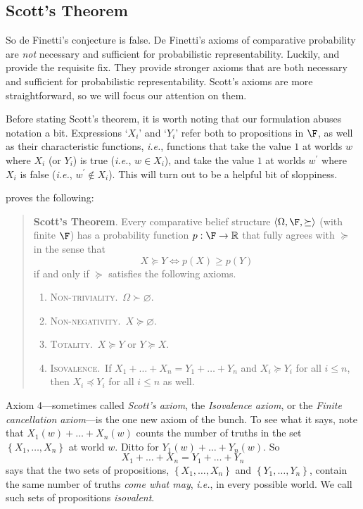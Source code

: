 \subsection{Scott's Theorem}


So de Finetti's conjecture is false. De Finetti's axioms of comparative probability are \textit{not} necessary and sufficient for probabilistic representability. Luckily, \citet{Kraft1959} and \citet{Scott1964} provide the requisite fix. They provide stronger axioms that are both necessary and sufficient for probabilistic representability. Scott's axioms are more straightforward, so we will focus our attention on them. 

Before stating Scott's theorem, it is worth noting that our formulation abuses notation a bit. Expressions `$X_i$' and `$Y_i$' refer both to propositions in $\F$, as well as their characteristic functions, \textit{i.e.}, functions that take the value $1$ at worlds $w$ where $X_i$ (or $Y_i$) is true (\textit{i.e.}, $w\in X_i$), and take the value $1$ at worlds $w^\prime$ where $X_i$ is false (\textit{i.e.}, $w^\prime\not\in X_i$). This will turn out to be a helpful bit of sloppiness. 


\citet{Scott1964} proves the following: 
\begin{quote}
\textbf{Scott's Theorem}. Every comparative belief structure $\left<\Omega,\F,\succeq\right>$ (with finite $\F$) has a probability function $p:\F\rightarrow\mathbb{R}$ that fully agrees with $\succeq$ in the sense that
\[
X\succeq Y \Leftrightarrow p(X)\geq p(Y)
\]
if and only if $\succeq$ satisfies the following axioms.
\begin{enumerate}
\item \textsc{Non-triviality}.\, $\Omega\succ \varnothing$.
\item \textsc{Non-negativity}.\, $X\succeq \varnothing$.
\item \textsc{Totality}.\, $X\succeq Y$ or $Y\succeq X$.
\item \textsc{Isovalence}.\, If $X_1+\ldots+X_n=Y_1+\ldots+Y_n$ and $X_i\succeq Y_i$ for all $i\leq n$, then $X_i\preceq Y_i$ for all $i\leq n$ as well.
\end{enumerate}
\end{quote}
Axiom 4---sometimes called \textit{Scott's axiom}, the \textit{Isovalence axiom}, or the \textit{Finite cancellation axiom}---is the one new axiom of the bunch. To see what it says, note that $X_1(w)+\ldots+X_n(w)$ counts the number of truths in the set $\left\{X_1,\hdots,X_n\right\}$ at world $w$. Ditto for $Y_1(w)+\ldots+Y_n(w)$. So
\[
X_1+\ldots+X_n=Y_1+\ldots+Y_n
\]
says that the two sets of propositions, $\left\{X_1,\hdots,X_n\right\}$ and $\left\{Y_1,\hdots,Y_n\right\}$, contain the same number of truths \textit{come what may}, \textit{i.e.}, in every possible world. We call such sets of propositions  \textit{isovalent}.

